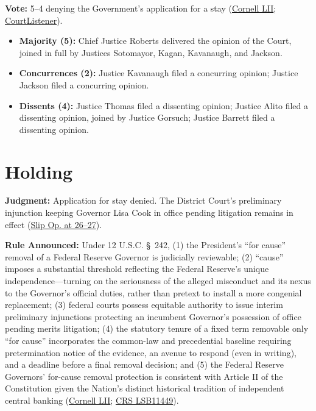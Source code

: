 \documentclass[12pt]{article}
\begin{document}
\textbf{Vote:} 5--4 denying the Government's application for a stay (\href{https://www.law.cornell.edu/supremecourt/text/25A312}{Cornell LII}; \href{https://www.courtlistener.com/opinion/10881682/trump-v-cook/}{CourtListener}).

\begin{itemize}
    \item \textbf{Majority (5):} Chief Justice Roberts delivered the opinion of the Court, joined in full by Justices Sotomayor, Kagan, Kavanaugh, and Jackson.
    \item \textbf{Concurrences (2):} Justice Kavanaugh filed a concurring opinion; Justice Jackson filed a concurring opinion.
    \item \textbf{Dissents (4):} Justice Thomas filed a dissenting opinion; Justice Alito filed a dissenting opinion, joined by Justice Gorsuch; Justice Barrett filed a dissenting opinion.
\end{itemize}

\section{Holding}

\textbf{Judgment:} Application for stay denied. The District Court's preliminary injunction keeping Governor Lisa Cook in office pending litigation remains in effect (\href{https://www.supremecourt.gov/opinions/25pdf/25a312_5468.pdf}{Slip Op. at 26--27}).

\textbf{Rule Announced:} Under 12 U.S.C. \S~242, (1) the President's ``for cause'' removal of a Federal Reserve Governor is judicially reviewable; (2) ``cause'' imposes a substantial threshold reflecting the Federal Reserve's unique independence---turning on the seriousness of the alleged misconduct and its nexus to the Governor's official duties, rather than pretext to install a more congenial replacement; (3) federal courts possess equitable authority to issue interim preliminary injunctions protecting an incumbent Governor's possession of office pending merits litigation; (4) the statutory tenure of a fixed term removable only ``for cause'' incorporates the common-law and precedential baseline requiring pretermination notice of the evidence, an avenue to respond (even in writing), and a deadline before a final removal decision; and (5) the Federal Reserve Governors' for-cause removal protection is consistent with Article II of the Constitution given the Nation's distinct historical tradition of independent central banking (\href{https://www.law.cornell.edu/supremecourt/text/25A312}{Cornell LII}; \href{https://www.everycrsreport.com/reports/LSB11449.html}{CRS LSB11449}).
\end{document}
